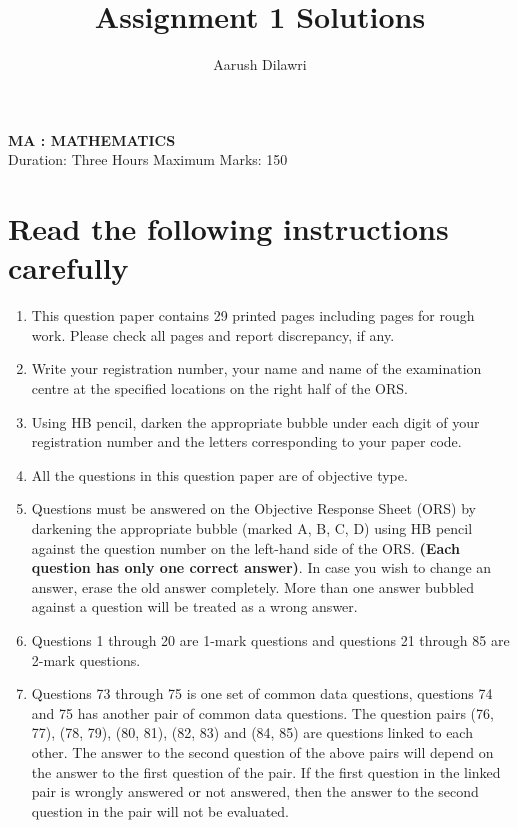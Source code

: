 \documentclass[11pt]{article}
\title{Assignment 1 Solutions}
\author{Aarush Dilawri}
\date{}
\begin{document}
\begin{center}
    \Large\textbf{MA : MATHEMATICS} \\
    \normalsize Duration: Three Hours \hfill Maximum Marks: 150
\end{center}

\vspace{0.5cm}

\section*{Read the following instructions carefully}

\begin{enumerate}[label=\arabic*.]
    \item This question paper contains 29 printed pages including pages for rough work. Please check all pages and report discrepancy, if any.

    \item Write your registration number, your name and name of the examination centre at the specified locations on the right half of the ORS.

    \item Using HB pencil, darken the appropriate bubble under each digit of your registration number and the letters corresponding to your paper code.

    \item All the questions in this question paper are of objective type.

    \item Questions must be answered on the Objective Response Sheet (ORS) by darkening the appropriate bubble (marked A, B, C, D) using HB pencil against the question number on the left-hand side of the ORS. \textbf{(Each question has only one correct answer)}. In case you wish to change an answer, erase the old answer completely. More than one answer bubbled against a question will be treated as a wrong answer.

    \item Questions 1 through 20 are 1-mark questions and questions 21 through 85 are 2-mark questions.

    \item Questions 73 through 75 is one set of common data questions, questions 74 and 75 has another pair of common data questions. The question pairs (76, 77), (78, 79), (80, 81), (82, 83) and (84, 85) are questions linked to each other. The answer to the second question of the above pairs will depend on the answer to the first question of the pair. If the first question in the linked pair is wrongly answered or not answered, then the answer to the second question in the pair will not be evaluated.


\end{enumerate}
\end{document}
